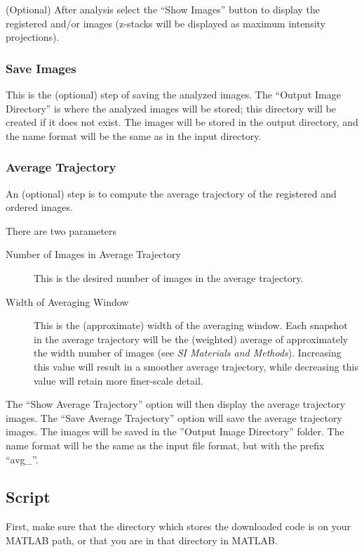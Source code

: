 \documentclass[12pt]{article}
\newcommand{\SI}[0]{\textit{SI Materials and Methods}}
\begin{document}
(Optional) After analysis select the ``Show Images'' button to display the registered and/or images (z-stacks will be displayed as maximum intensity projections). 


\subsubsection{Save Images}

This is the (optional) step of saving the analyzed images.
%
The ``Output Image Directory'' is where the analyzed images will be stored; this directory will be created if it does not exist. 
%
The images will be stored in the output directory, and the name format will be the same as in the input directory. 

\subsubsection{Average Trajectory}

An (optional) step is to compute the average trajectory of the registered and ordered images.

There are two parameters
\begin{description}
\item[Number of Images in Average Trajectory] This is the desired number of images in the average trajectory. 
%
\item[Width of Averaging Window] This is the (approximate) width of the averaging window. Each snapshot in the average trajectory will be the (weighted) average of approximately the width number of images (see \SI). Increasing this value will result in a smoother average trajectory, while decreasing this value will retain more finer-scale detail. 
% 
\end{description}

The ``Show Average Trajectory'' option will then display the average trajectory images. 
%
The ``Save Average Trajectory'' option will save the average trajectory images. 
%
The images will be saved in the ''Output Image Directory'' folder. 
%
The name format will be the same as the input file format, but with the prefix ``avg\_''.

\subsection{Script}

First, make sure that the directory which stores the downloaded code is on your MATLAB path, or that you are in that directory in MATLAB. 
\end{document}
